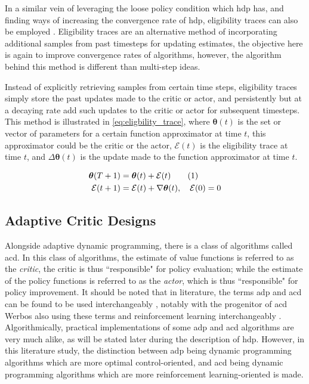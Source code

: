 \documentclass[../report.tex]{subfiles}
\begin{document}
In a similar vein of leveraging the loose policy condition which \ac{hdp} has, and finding ways of increasing the convergence rate of \ac{hdp}, eligibility traces can also be employed \cite{elig_hdp,elig_gdhp}. Eligibility traces are an alternative method of incorporating additional samples from past timesteps for updating estimates, the objective here is again to improve convergence rates of algorithms, however, the algorithm behind this method is different than multi-step ideas.

Instead of explicitly retrieving samples from certain time steps, eligibility traces simply store the past updates made to the critic or actor, and persistently but at a decaying rate add such updates to the critic or actor for subsequent timesteps. This method is illustrated in \autoref{eq:eligbility_trace}, where $\boldsymbol{\theta}(t)$ is the set or vector of parameters for a certain function approximator at time $t$, this approximator could be the critic or the actor, $\mathcal{E}(t)$ is the eligibility trace at time $t$, and $\Delta \boldsymbol{\theta}(t)$ is the update made to the function approximator at time $t$.

\begin{align*}
    \boldsymbol{\theta}(T+1) &= \boldsymbol{\theta}(t) + \mathcal{E}(t) \stepcounter{equation}\tag{\theequation}\label{eq:eligbility_trace}\\
    \mathcal{E}(t+1) &= \mathcal{E}(t) + \nabla \boldsymbol{\theta}(t) ,\quad \mathcal{E}(0) = 0\\
\end{align*}

\subsection{Adaptive Critic Designs}\label{subsec:acd}

Alongside adaptive dynamic programming, there is a class of algorithms called \ac{acd}. In this class of algorithms, the estimate of value functions is referred to as the \textit{critic}, the critic is thus ``responsible" for policy evaluation; while the estimate of the policy functions is referred to as the \textit{actor}, which is thus ``responsible" for policy improvement. It should be noted that in literature, the terms \ac{adp} and \ac{acd} can be found to be used interchangeably \cite{adp_for_control, acd, old_acd}, notably with the progenitor of \ac{acd} Werbos also using these terms and reinforcement learning interchangeably \cite{vi_for_optimal_control}. Algorithmically, practical implementations of some \ac{adp} and \ac{acd} algorithms are very much alike, as will be stated later during the description of \ac{hdp}. However, in this literature study, the distinction between \ac{adp} being dynamic programming algorithms which are more optimal control-oriented, and \ac{acd} being dynamic programming algorithms which are more reinforcement learning-oriented is made.
\end{document}
